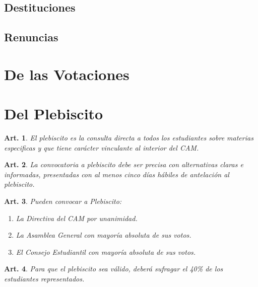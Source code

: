 \documentclass[letterpaper,11pt]{article}
\theoremstyle{plain}
\newtheorem{art}{Art.} %
\begin{document}
\subsection{Destituciones}\label{destituciones}
	
\subsection{Renuncias}\label{renuncias}

\section{De las Votaciones}\label{votaciones}

\section{Del Plebiscito}\label{plebiscito}

\begin{art}\label{plebiscitoDescripcion}
	El plebiscito es la consulta  directa a todos los estudiantes sobre materias especificas y que tiene carácter vinculante al interior del CAM.
\end{art}

\begin{art}\label{plebiscitoAntelacion}
	La convocatoria a plebiscito debe ser precisa con alternativas claras e informadas, presentadas con al menos cinco días hábiles de antelación al plebiscito.
\end{art}

\begin{art}\label{plebiscitoConvocar}
	Pueden convocar a Plebiscito:
	\begin{enumerate}
		\item La Directiva del CAM por unanimidad.
		\item La Asamblea General con mayoría absoluta de sus votos.
		\item El Consejo Estudiantil con mayoría absoluta de sus votos. %
	\end{enumerate}
\end{art}

\begin{art}\label{plebiscitoValidez}
	Para que el plebiscito sea válido, deberá sufragar el 40\% de los estudiantes representados.
\end{art}
\end{document}
